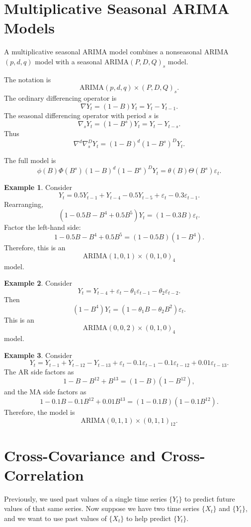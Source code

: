 \documentclass[12pt,oneside]{book}
\numberwithin{equation}{section}
\theoremstyle{definition}
\newtheorem{example}{Example}[section]
\theoremstyle{plain}
\theoremstyle{remark}
\begin{document}
\section{Multiplicative Seasonal ARIMA Models}

A multiplicative seasonal ARIMA model combines a nonseasonal ARIMA$(p,d,q)$ model with a seasonal ARIMA$(P,D,Q)_s$ model.

The notation is
\[
\mathrm{ARIMA}(p,d,q)\times(P,D,Q)_s.
\]
The ordinary differencing operator is
\[
\nabla Y_t
=
(1-B)Y_t
=
Y_t-Y_{t-1}.
\]
The seasonal differencing operator with period $s$ is
\[
\nabla_sY_t
=
(1-B^s)Y_t
=
Y_t-Y_{t-s}.
\]
Thus
\[
\nabla^d\nabla_s^DY_t
=
(1-B)^d(1-B^s)^DY_t.
\]

The full model is
\[
\phi(B)\Phi(B^s)(1-B)^d(1-B^s)^DY_t
=
\theta(B)\Theta(B^s)\varepsilon_t.
\]

\begin{example}
Consider
\[
Y_t=0.5Y_{t-1}+Y_{t-4}-0.5Y_{t-5}+\varepsilon_t-0.3\varepsilon_{t-1}.
\]
Rearranging,
\[
(1-0.5B-B^4+0.5B^5)Y_t
=
(1-0.3B)\varepsilon_t.
\]
Factor the left-hand side:
\[
1-0.5B-B^4+0.5B^5
=
(1-0.5B)(1-B^4).
\]
Therefore, this is an
\[
\mathrm{ARIMA}(1,0,1)\times(0,1,0)_4
\]
model.
\end{example}

\begin{example}
Consider
\[
Y_t=Y_{t-4}+\varepsilon_t-\theta_1\varepsilon_{t-1}-\theta_2\varepsilon_{t-2}.
\]
Then
\[
(1-B^4)Y_t=(1-\theta_1B-\theta_2B^2)\varepsilon_t.
\]
This is an
\[
\mathrm{ARIMA}(0,0,2)\times(0,1,0)_4
\]
model.
\end{example}

\begin{example}
Consider
\[
Y_t=Y_{t-1}+Y_{t-12}-Y_{t-13}
+\varepsilon_t-0.1\varepsilon_{t-1}-0.1\varepsilon_{t-12}
+0.01\varepsilon_{t-13}.
\]
The AR side factors as
\[
1-B-B^{12}+B^{13}
=
(1-B)(1-B^{12}),
\]
and the MA side factors as
\[
1-0.1B-0.1B^{12}+0.01B^{13}
=
(1-0.1B)(1-0.1B^{12}).
\]
Therefore, the model is
\[
\mathrm{ARIMA}(0,1,1)\times(0,1,1)_{12}.
\]
\end{example}

\section{Cross-Covariance and Cross-Correlation}

Previously, we used past values of a single time series $\{Y_t\}$ to predict future values of that same series. Now suppose we have two time series $\{X_t\}$ and $\{Y_t\}$, and we want to use past values of $\{X_t\}$ to help predict $\{Y_t\}$.
\end{document}
